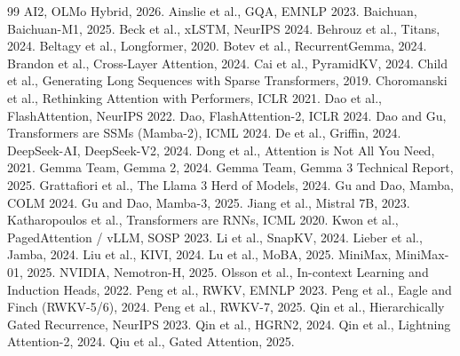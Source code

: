 \documentclass[11pt,a4paper]{article}
\begin{document}
\begin{thebibliography}{99}
 AI2, OLMo Hybrid, 2026.
 Ainslie et al., GQA, EMNLP 2023.
 Baichuan, Baichuan-M1, 2025.
 Beck et al., xLSTM, NeurIPS 2024.
 Behrouz et al., Titans, 2024.
 Beltagy et al., Longformer, 2020.
 Botev et al., RecurrentGemma, 2024.
 Brandon et al., Cross-Layer Attention, 2024.
 Cai et al., PyramidKV, 2024.
 Child et al., Generating Long Sequences with Sparse Transformers, 2019.
 Choromanski et al., Rethinking Attention with Performers, ICLR 2021.
 Dao et al., FlashAttention, NeurIPS 2022.
 Dao, FlashAttention-2, ICLR 2024.
 Dao and Gu, Transformers are SSMs (Mamba-2), ICML 2024.
 De et al., Griffin, 2024.
 DeepSeek-AI, DeepSeek-V2, 2024.
 Dong et al., Attention is Not All You Need, 2021.
 Gemma Team, Gemma 2, 2024.
 Gemma Team, Gemma 3 Technical Report, 2025.
 Grattafiori et al., The Llama 3 Herd of Models, 2024.
 Gu and Dao, Mamba, COLM 2024.
 Gu and Dao, Mamba-3, 2025.
 Jiang et al., Mistral 7B, 2023.
 Katharopoulos et al., Transformers are RNNs, ICML 2020.
 Kwon et al., PagedAttention / vLLM, SOSP 2023.
 Li et al., SnapKV, 2024.
 Lieber et al., Jamba, 2024.
 Liu et al., KIVI, 2024.
 Lu et al., MoBA, 2025.
 MiniMax, MiniMax-01, 2025.
 NVIDIA, Nemotron-H, 2025.
 Olsson et al., In-context Learning and Induction Heads, 2022.
 Peng et al., RWKV, EMNLP 2023.
 Peng et al., Eagle and Finch (RWKV-5/6), 2024.
 Peng et al., RWKV-7, 2025.
 Qin et al., Hierarchically Gated Recurrence, NeurIPS 2023.
 Qin et al., HGRN2, 2024.
 Qin et al., Lightning Attention-2, 2024.
 Qiu et al., Gated Attention, 2025.

\end{thebibliography}
\end{document}
